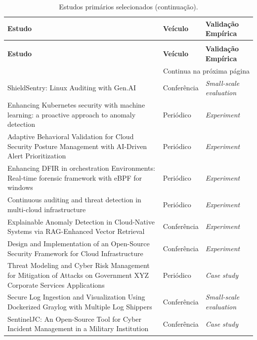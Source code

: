 {\small\setlength{\tabcolsep}{4pt}
\begin{longtable}{p{8.4cm}p{2.2cm}p{3.4cm}}
    \caption{Estudos primários selecionados.}\label{tab:rsl_amostra}\\
    \hline
    \textbf{Estudo} & \textbf{Veículo} & \textbf{Validação Empírica} \\ \hline
    \endfirsthead
    \caption[]{Estudos primários selecionados (continuação).}\\
    \hline
    \textbf{Estudo} & \textbf{Veículo} & \textbf{Validação Empírica} \\ \hline
    \endhead
    \hline \multicolumn{3}{r}{\footnotesize Continua na próxima página} \\
    \endfoot
    \hline
    \endlastfoot
ShieldSentry: Linux Auditing with Gen.AI~\cite{gajra2025} & Conferência & \textit{Small-scale evaluation} \\ \hline
Enhancing Kubernetes security with machine learning: a proactive approach to anomaly detection~\cite{darwesh2024} & Periódico & \textit{Experiment} \\ \hline
Adaptive Behavioral Validation for Cloud Security Posture Management with AI-Driven Alert Prioritization~\cite{joshisabhaya2026} & Periódico & \textit{Experiment} \\ \hline
Enhancing DFIR in orchestration Environments: Real-time forensic framework with eBPF for windows~\cite{jin2025} & Periódico & \textit{Experiment} \\ \hline
Continuous auditing and threat detection in multi-cloud infrastructure~\cite{torkura2021} & Periódico & \textit{Experiment} \\ \hline
Explainable Anomaly Detection in Cloud-Native Systems via RAG-Enhanced Vector Retrieval~\cite{devarajulu2025} & Conferência & \textit{Experiment} \\ \hline
Design and Implementation of an Open-Source Security Framework for Cloud Infrastructure~\cite{shao2026a} & Conferência & \textit{Experiment} \\ \hline
Threat Modeling and Cyber Risk Management for Mitigation of Attacks on Government XYZ Corporate Services Applications~\cite{sasmito2025} & Periódico & \textit{Case study} \\ \hline
Secure Log Ingestion and Visualization Using Dockerized Graylog with Multiple Log Shippers~\cite{sushma2025} & Conferência & \textit{Small-scale evaluation} \\ \hline
SentinelJC: An Open-Source Tool for Cyber Incident Management in a Military Institution~\cite{acosta2025} & Conferência & \textit{Case study} \\ \hline

\end{longtable}}

